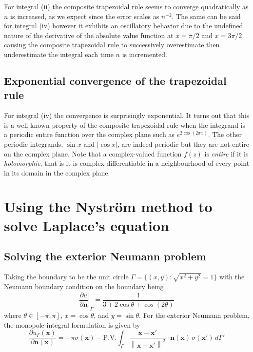 \documentclass[11pt]{article}
\newcommand\p[2]{\frac{\partial #1}{\partial #2}}
\newcommand{\norm}[1]{\left\lVert#1\right\rVert}
\begin{document}
For integral (ii) the composite trapezoidal rule seems to converge quadratically as $n$ is increased, as we expect since the error scales as $n^{-2}$. The same can be said for integral (iv) however it exhibits an oscillatory behavior due to the undefined nature of the derivative of the absolute value function at $x=\pi/2$ and $x=3\pi/2$ causing the composite trapezoidal rule to successively overestimate then underestimate the integral each time $n$ is incremented.

\subsection{Exponential convergence of the trapezoidal rule}

For integral (iv) the convergence is surprisingly exponential. It turns out that this is a well-known property of the composite trapezoidal rule when the integrand is a periodic entire function over the complex plane such as $e^{2\cos(2\pi x)}$. The other periodic integrands, $\sin x$ and $|\cos x|$, are indeed periodic but they are not entire on the complex plane. Note that a complex-valued function $f(z)$ is \emph{entire} if it is \emph{holomorphic}, that is it is complex-differentiable in a neighbourhood of every point in its domain in the complex plane.

\section{Using the Nyström method to solve Laplace's equation}

\subsection{Solving the exterior Neumann problem}
Taking the boundary to be the unit circle $\Gamma = \{(x,y) : \sqrt{x^2 + y^2} = 1\}$ with the Neumann boundary condition on the boundary being
\begin{equation}
  \left. \p{u}{\bm{n}} \right\rvert_\Gamma =  \frac{1}{3 + 2\cos\theta + \cos(2\theta)}
\end{equation}
where $\theta \in [-\pi, \pi]$, $x = \cos\theta$, and $y = \sin\theta$. For the exterior Neumann problem, the monopole integral formulation is given by
\begin{equation}
  \p{u_\Gamma(\bm{x})}{\bm{n}(\bm{x})}
  = -\pi\sigma(\bm{x}) - \mathrm{P.V.}\int_\Gamma \frac{\bm{x-x'}}{\norm{\bm{x-x'}}^2} \cdot \bm{n}(\bm{x}) \, \sigma(\bm{x}') \, d\Gamma'
\end{equation}
\end{document}
